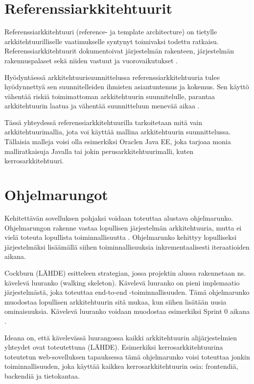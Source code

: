 \section{Referenssiarkkitehtuurit}
Referenssiarkkitehtuuri (reference- ja template architecture) on tietylle arkkitehtuurilliselle vaatimukselle syntynyt toimivaksi todettu ratkaisu. Referenssiarkkitehtuurit dokumentoivat järjestelmän rakenteen, järjestelmän rakennuspalaset sekä niiden vastuut ja vuorovaikutukset \citep{vogel2011software}. 

Hyödyntäessä arkkitehtuurisuunnittelussa referenssiarkkitehtuuria tulee hyödynnettyä sen suunnitelleiden ihmisten asiantuntemus ja kokemus. Sen käyttö vähentää riskiä toimimattoman arkkitehtuurin suunnitelulle, parantaa arkkitehtuurin laatua ja vähentää suunnitteluun menevää aikaa \citep{vogel2011software}.

Tässä yhteydessä referenssiarkkitehtuurilla tarkoitetaan mitä vain arkkitehtuurimallia, jota voi käyttää mallina arkkitehtuurin suunnittelussa. Tällaisia malleja voisi olla esimerkiksi Oraclen Java EE, joka tarjoaa monia malliratkaisuja Javalla tai jokin perusarkkitehtuurimalli, kuten kerrosarkkitehtuuri.

\section{Ohjelmarungot}
Kehitettävän sovelluksen pohjaksi voidaan toteuttaa alustava ohjelmarunko. Ohjelmarungon rakenne vastaa lopullisen järjestelmän arkkitehtuuria, mutta ei vielä toteuta lopullista toiminnallisuutta \citep{vogel2011software}. Ohjelmarunko kehittyy lopulliseksi järjestelmäksi lisäämällä siihen toiminnallisuuksia inkrementaalisesti iteraatioiden aikana.

Cockburn (LÄHDE) esitteleen strategian, jossa projektin alussa rakennetaan ns. kävelevä luuranko (walking skeleton). Kävelevä luuranko on pieni implemaatio järjestelmästä, joka toteuttaa end-to-end -toiminnallisuuden. Tämä ohjelmarunko muodostaa lopullisen arkkitehtuurin sitä mukaa, kun siihen lisätään uusia ominaisuuksia. Kävelevä luuranko voidaan muodostaa esimerkiksi Sprint 0 aikana \citep{eloranta2015techniques}.

Ideana on, että kävelevässä luurangossa kaikki arkkitehtuurin alijärjestelmien yhteydet ovat toteutettuna (LÄHDE).
Esimerkiksi kerrosarkkitehtuurina toteutetun web-sovelluksen tapauksessa tämä ohjelmarunko voisi toteuttaa jonkin toiminnallisuuden, joka käyttää kaikkea kerrosarkkitehtuurin osia: frontendiä, backendiä ja tietokantaa.

